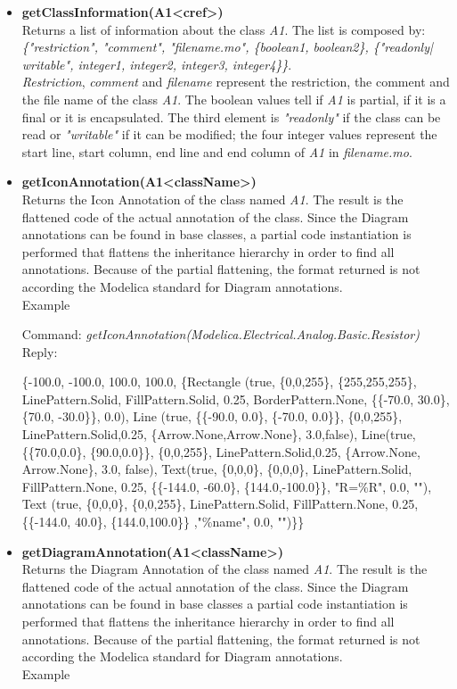 \documentclass[11pt,a4paper,oneside,english]{book}
\newenvironment{modelicaExamples}{\begin{itemize}}{\end{itemize}}
\newcommand{\api}[2]{\item \textbf{#1} \\ #2}
\newcommand{\command}[1]{Command: \textit{#1}\\}
\newcommand{\reply}[1]{Reply: #1}
\newcommand{\functionex}[2]{\begin{singlespace} \command{#1} \reply{#2} \end{singlespace}}
\newcommand{\examples}{Example}
\begin{document}
\begin{modelicaExamples}
		\api{getClassInformation(A1<cref>)}{Returns a list of information about the class \textit{A1}. The list is composed by: \textit{\{"restriction", "comment", "filename.mo", \{boolean1, boolean2\}, \{"readonly| writable", integer1, integer2, integer3, integer4\}\}}.
		\\  \textit{Restriction}, \textit{comment} and \textit{filename} represent the restriction, the comment and the file name of the class \textit{A1}. The boolean values tell if \textit{A1} is partial, if it is a final or it is encapsulated. The third element is \textit{"readonly"} if the class can be read or \textit{"writable"} if it can be modified; the four integer values represent the start line, start column, end line and end column of \textit{A1} in \textit{filename.mo}.
		}
		
		\api{getIconAnnotation(A1<className>)}{Returns the Icon Annotation of the class named \textit{A1}. The result is the flattened code of the actual annotation of the class. Since the Diagram annotations can be found in base classes, a partial code instantiation is performed that flattens the inheritance hierarchy in order to find all annotations. Because of the partial flattening, the format returned is not according the Modelica standard for Diagram annotations.\\
		\examples
		
		\functionex{getIconAnnotation(Modelica.Electrical.Analog.Basic.Resistor)}
		{\begin{scriptsize}\{-100.0, -100.0, 100.0, 100.0, \{Rectangle (true, \{0,0,255\}, \{255,255,255\}, LinePattern.Solid, FillPattern.Solid, 0.25, BorderPattern.None, \{\{-70.0, 30.0\}, \{70.0, -30.0\}\}, 0.0), Line (true, \{\{-90.0, 0.0\}, \{-70.0, 0.0\}\}, \{0,0,255\}, LinePattern.Solid,0.25,
 \{Arrow.None,Arrow.None\}, 3.0,false), Line(true, \{\{70.0,0.0\}, \{90.0,0.0\}\}, 
 \{0,0,255\}, LinePattern.Solid,0.25, \{Arrow.None, Arrow.None\}, 3.0, false), Text(true, \{0,0,0\}, 
\{0,0,0\}, LinePattern.Solid, FillPattern.None, 0.25, \{\{-144.0, -60.0\}, 
\{144.0,-100.0\}\}, "R=\%R", 0.0, ""), Text (true, 
\{0,0,0\}, \{0,0,255\}, LinePattern.Solid, FillPattern.None, 0.25, \{\{-144.0, 40.0\}, 
\{144.0,100.0\}\} ,"\%name", 0.0, "")\}\}
		\end{scriptsize}}
		}
		
		\api{getDiagramAnnotation(A1<className>)}{Returns the Diagram Annotation of the class named \textit{A1}. The result is the flattened code of the actual annotation of the class. Since the Diagram annotations can be found in base classes a partial code instantiation is performed that flattens the inheritance hierarchy in order to find all annotations. Because of the partial flattening, the format returned is not according the Modelica standard for Diagram annotations.\\
		\examples
		
}
\end{modelicaExamples}
\end{document}
